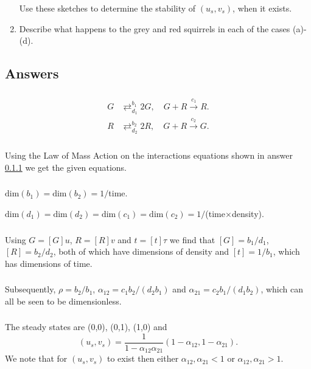 \documentclass[]{article}
\newcommand{\bb}{\begin{equation}}
\newcommand{\ee}{\end{equation}}
\begin{document}
\begin{enumerate}
Use these sketches to determine the stability of $(u_s,v_s)$, when it exists.
\item Describe what happens to the grey and red squirrels in each of the cases (a)-(d).
\end{enumerate}
\begin{Answ}
\subsection{Answers}
\subsubsection{}\label{Interaction_equations}
\begin{align}
G&\mathrel{\mathop{\rightleftarrows}^{b_1}_{d_1}}2G,\quad G+R\stackrel{c_1}{\rightarrow}R.\\
R&\mathrel{\mathop{\rightleftarrows}^{b_2}_{d_2}}2R,\quad G+R\stackrel{c_2}{\rightarrow}G.
\end{align}
\subsubsection{}
Using the Law of Mass Action on the interactions equations shown in answer \ref{Interaction_equations} we get the given equations.
\subsubsection{}
$\textrm{dim}(b_1)=\textrm{dim}(b_2)=1/$time.

\noindent$\textrm{dim}(d_1)=\textrm{dim}(d_2)=\textrm{dim}(c_1)=\textrm{dim}(c_2)=1/$(time$\times$density).

\subsubsection{}
Using $G=[G]u$, $R=[R]v$ and $t= [t]\tau$ we find that $[G]=b_1/d_1$, $[R]=b_2/d_2$, both of which have dimensions of density and $[t]=1/b_1$, which has dimensions of time. 
\subsubsection{}
Subsequently, $\rho=b_2/b_1$, $\alpha_{12}=c_1b_2/(d_2b_1)$ and $\alpha_{21}=c_2b_1/(d_1b_2)$, which can all be seen to be dimensionless.
\subsubsection{}
The steady states are (0,0), (0,1), (1,0) and
\bb
(u_s,v_s)=\frac{1}{1-\alpha_{12}\alpha_{21}}(1-\alpha_{12},1-\alpha_{21}).
\ee
We note that for $(u_s,v_s)$ to exist then either $\alpha_{12}, \alpha_{21}<1$ or $\alpha_{12}, \alpha_{21}>1$.

\end{Answ}
\end{document}
